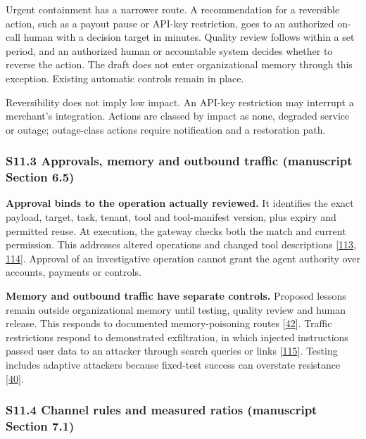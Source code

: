 \documentclass[
  11pt,
]{article}
\begin{document}
Urgent containment has a narrower route. A recommendation for a
reversible action, such as a payout pause or API-key restriction, goes
to an authorized on-call human with a decision target in minutes.
Quality review follows within a set period, and an authorized human or
accountable system decides whether to reverse the action. The draft does
not enter organizational memory through this exception. Existing
automatic controls remain in place.

Reversibility does not imply low impact. An API-key restriction may
interrupt a merchant's integration. Actions are classed by impact as
none, degraded service or outage; outage-class actions require
notification and a restoration path.

\hypertarget{s11.3-approvals-memory-and-outbound-traffic-manuscript-section-6.5}{%
\subsubsection{S11.3 Approvals, memory and outbound traffic (manuscript
Section
6.5)}\label{s11.3-approvals-memory-and-outbound-traffic-manuscript-section-6.5}}

\textbf{Approval binds to the operation actually reviewed.} It
identifies the exact payload, target, task, tenant, tool and
tool-manifest version, plus expiry and permitted reuse. At execution,
the gateway checks both the match and current permission. This addresses
altered operations and changed tool descriptions
{[}\protect\hyperlink{ref-Kumar2026}{113},
\protect\hyperlink{ref-InvariantLabs2025}{114}{]}. Approval of an
investigative operation cannot grant the agent authority over accounts,
payments or controls.

\textbf{Memory and outbound traffic have separate controls.} Proposed
lessons remain outside organizational memory until testing, quality
review and human release. This responds to documented memory-poisoning
routes {[}\protect\hyperlink{ref-Dash2026}{42}{]}. Traffic restrictions
respond to demonstrated exfiltration, in which injected instructions
passed user data to an attacker through search queries or links
{[}\protect\hyperlink{ref-Greshake2023}{115}{]}. Testing includes
adaptive attackers because fixed-test success can overstate resistance
{[}\protect\hyperlink{ref-Nasr2025}{40}{]}.

\hypertarget{s11.4-channel-rules-and-measured-ratios-manuscript-section-7.1}{%
\subsubsection{S11.4 Channel rules and measured ratios (manuscript
Section
7.1)}\label{s11.4-channel-rules-and-measured-ratios-manuscript-section-7.1}}
\end{document}
